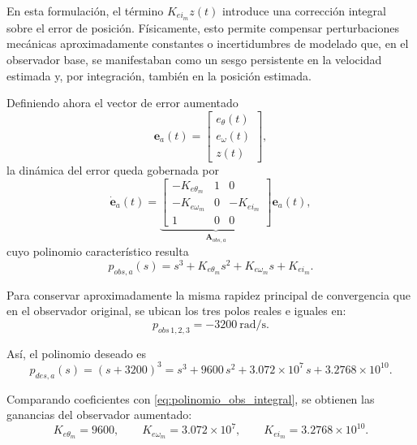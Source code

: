 \documentclass[12pt, a4paper,journal, onecolumn, compsoc]{IEEEtran}
\begin{document}
En esta formulación, el término $K_{ei_m}z(t)$ introduce una corrección integral sobre el error de posición. Físicamente, esto permite compensar perturbaciones mecánicas aproximadamente constantes o incertidumbres de modelado que, en el observador base, se manifestaban como un sesgo persistente en la velocidad estimada y, por integración, también en la posición estimada.

Definiendo ahora el vector de error aumentado
\begin{equation}
\mathbf e_a(t)=
\begin{bmatrix}
e_\theta(t)\\
e_\omega(t)\\
z(t)
\end{bmatrix},
\end{equation}
la dinámica del error queda gobernada por
\begin{equation}
\dot{\mathbf e}_a(t)=
\underbrace{
\begin{bmatrix}
-K_{e\theta_m} & 1 & 0\\
-K_{e\omega_m} & 0 & -K_{ei_m}\\
1 & 0 & 0
\end{bmatrix}
}_{\mathbf A_{obs,a}}
\mathbf e_a(t),
\end{equation}
cuyo polinomio característico resulta
\begin{equation}
\label{eq:polinomio_obs_integral}
p_{obs,a}(s)=s^3+K_{e\theta_m}s^2+K_{e\omega_m}s+K_{ei_m}.
\end{equation}

Para conservar aproximadamente la misma rapidez principal de convergencia que en el observador original, se ubican los tres polos reales e iguales en:
\begin{equation}
p_{obs\,1,2,3}=-3200\ \text{rad/s}.
\end{equation}

Así, el polinomio deseado es
\begin{equation}
p_{des,a}(s)=(s+3200)^3
=s^3+9600\,s^2+3.072\times10^7\,s+3.2768\times10^{10}.
\end{equation}

Comparando coeficientes con \eqref{eq:polinomio_obs_integral}, se obtienen las ganancias del observador aumentado:
\begin{equation}
\label{eq:ganancias_obs_integral}
K_{e\theta_m}=9600,
\qquad
K_{e\omega_m}=3.072\times10^7,
\qquad
K_{ei_m}=3.2768\times10^{10}.
\end{equation}
\end{document}

